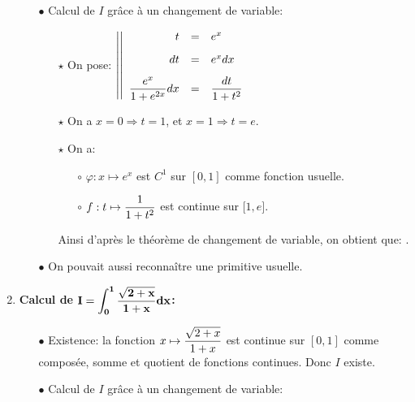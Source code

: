 \documentclass[a4paper, 11pt,reqno]{article}
\begin{document}
\begin{correction}
\begin{enumerate}
\begin{itemize}
			      \item[$\bullet$] Calcul de $I$ gr\^{a}ce \`{a} un changement de variable:
			            \begin{itemize}
				            \item[$\star$] On pose: $\left| \left|\begin{array}{rll}
						                  t                           & = & e^x\vsec             \\
						                  dt                          & = & e^xdx \vsec          \\
						                  \ddp\frac{e^x}{1+e^{2x}} dx & = & \ddp\frac{dt}{1+t^2}
					                  \end{array}\right.\right.$
				            \item[$\star$] On a $x=0 \Rightarrow t=1$, et $x=1 \Rightarrow t= e$.
				            \item[$\star$] On a:
				                  \begin{itemize}
					                  \item[$\circ$] $\varphi: x\mapsto e^x$ est $C^1$ sur $\left\lbrack 0,1 \right\rbrack$ comme fonction usuelle.
					                  \item[$\circ$] $f: t\mapsto   \displaystyle\frac{1}{1+t^2}$ est continue sur $\lbrack 1,e\rbrack$.
				                  \end{itemize}
				                  Ainsi d'apr\`{e}s le th\'eor\`{e}me de changement de variable, on obtient que:
				                  .
			            \end{itemize}
			      \item[$\bullet$] On pouvait aussi reconna\^{i}tre une primitive usuelle.
		      \end{itemize}
		\item \textbf{Calcul de $\mathbf{\displaystyle I=\int_0^1 \displaystyle\frac{\sqrt{2+x}}{1+x} dx}$:}
		      \begin{itemize}
			      \item[$\bullet$] Existence: la fonction $x\mapsto  \displaystyle\frac{\sqrt{2+x}}{1+x} $ est continue sur $\left\lbrack 0,1 \right\rbrack$ comme compos\'ee, somme et quotient de fonctions continues. Donc $I$ existe.
			      \item[$\bullet$] Calcul de $I$ gr\^{a}ce \`{a} un changement de variable:
			            \begin{itemize}

\end{itemize}
\end{itemize}
\end{enumerate}
\end{correction}
\end{document}
